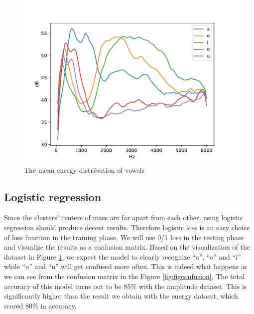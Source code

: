 \documentclass[letterpaper,12pt]{article}
\begin{document}
\begin{figure}
    \centering
    \includegraphics[scale = 0.8]{energy_distribution.pdf}
    \caption{The mean energy distribution of vowels}
    \label{fig:figenergy}
\end{figure}

\subsection{Logistic regression}

Since the clusters' centers of mass are far apart from each other, using logistic regression should produce decent results. Therefore logistic loss is an easy choice of loss function in the training phase. We will use 0/1 loss in the testing phase and visualize the results as a confusion matrix. Based on the visualization of the dataset in Figure \ref{fig:figenergy}, we expect the model to clearly recognize ``a'', ``e'' and ``i'' while ``o'' and ``u'' will get confused more often. This is indeed what happens as we can see from the confusion matrix in the Figure \ref{fig:figconfusion}. The total accuracy of this model turns out to be $85\%$ with the amplitude dataset. This is significantly higher than the result we obtain with the energy dataset, which scored $80\%$ in accuracy.
\end{document}
